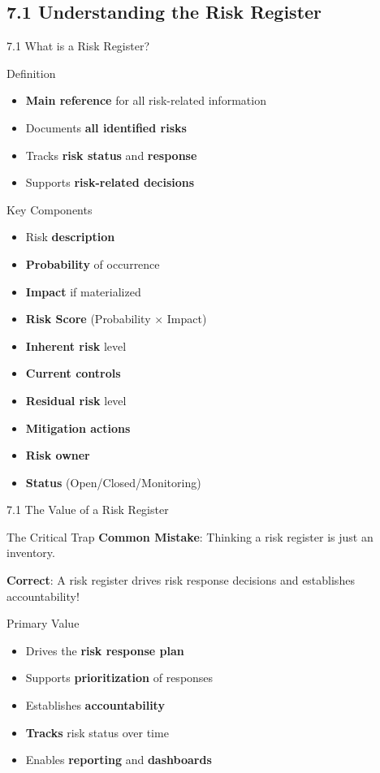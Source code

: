 \documentclass[9pt]{beamer}  %
\begin{document}
	\subsection{7.1 Understanding the Risk Register}
	\begin{frame}{7.1 What is a Risk Register?}
		\begin{block}{Definition}
			\begin{itemize}
				\item \textbf{Main reference} for all risk-related information
				\item Documents \textbf{all identified risks}
				\item Tracks \textbf{risk status} and \textbf{response}
				\item Supports \textbf{risk-related decisions}
			\end{itemize}
		\end{block}
		
		\begin{block}{Key Components}
			\begin{itemize}
				\item Risk \textbf{description}
				\item \textbf{Probability} of occurrence
				\item \textbf{Impact} if materialized
				\item \textbf{Risk Score} (Probability × Impact)
				\item \textbf{Inherent risk} level
				\item \textbf{Current controls}
				\item \textbf{Residual risk} level
				\item \textbf{Mitigation actions}
				\item \textbf{Risk owner}
				\item \textbf{Status} (Open/Closed/Monitoring)
			\end{itemize}
		\end{block}
	\end{frame}
	
	\begin{frame}{7.1 The Value of a Risk Register}
		\begin{alertblock}{The Critical Trap}
			\textbf{Common Mistake}: Thinking a risk register is just an inventory.
			
			\textbf{Correct}: A risk register drives risk response decisions and establishes accountability!
		\end{alertblock}
		
		\begin{block}{Primary Value}
			\begin{itemize}
				\item Drives the \textbf{risk response plan}
				\item Supports \textbf{prioritization} of responses
				\item Establishes \textbf{accountability}
				\item \textbf{Tracks} risk status over time
				\item Enables \textbf{reporting} and \textbf{dashboards}
			\end{itemize}
		\end{block}
	\end{frame}
	
\end{document}
